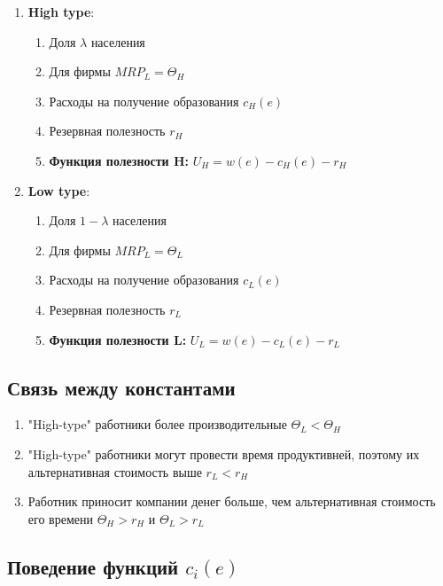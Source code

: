 \begin{enumerate}
    \item \textbf{High type}: \begin{enumerate}
            \item Доля $\lambda$ населения
            \item Для фирмы $MRP_L=\Theta_H$
            \item Расходы на получение образования $c_H(e)$
            \item Резервная полезность $r_H$
            \item \textbf{Функция полезности H:} $U_H=w(e)-c_H(e)-r_H$
        \end{enumerate}
        \item \textbf{Low type}: \begin{enumerate}
            \item Доля $1-\lambda$ населения
            \item Для фирмы $MRP_L=\Theta_L$
            \item Расходы на получение образования $c_L(e)$
            \item Резервная полезность $r_L$
            \item \textbf{Функция полезности L:} $U_L=w(e)-c_L(e)-r_L$
        \end{enumerate}
\end{enumerate}

\subsection{Связь между константами}

\begin{enumerate}
    \item "High-type" работники более производительные $\Theta_L<\Theta_H$
    \item "High-type" работники могут провести время продуктивней, поэтому их альтернативная стоимость выше $r_L<r_H$
    \item Работник приносит компании денег больше, чем альтернативная стоимость его времени $\Theta_H>r_H$ и $\Theta_L>r_L$
\end{enumerate}

\subsection{Поведение функций $c_i(e)$}

